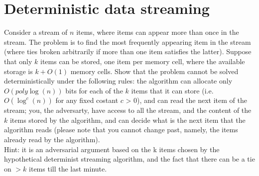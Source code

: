 \section{Deterministic data streaming}

Consider a stream of $n$ items, where items can appear more than once in the stream.
The problem is to find the most frequently appearing item in the stream (where ties
broken arbitrarily if more than one item satisfies the latter).
Suppose that only $k$ items can be stored, one item per memory cell, where the
available storage is $k + O(1)$ memory cells.
Show that the problem cannot be solved deterministically under the following rules:
the algorithm can allocate only $O(poly\log(n))$ bits for each of the $k$ items that
it can store (i.e. $O(\log^{c}(n))$ for any fixed costant $c$ > 0), and can read
the next item of the stream; you, the adversarty, have access to all the stream,
and the content of the $k$ items stored by the algorithm, and can decide what is
the next item that the algorithm reads (please note that you cannot change
past, namely, the items already read by the algorithm).
\\Hint: it is an adversarial argument based on the k items chosen by the
hypothetical determinist streaming algorithm, and the fact that there can be a
tie on $> k$ items till the last minute.

